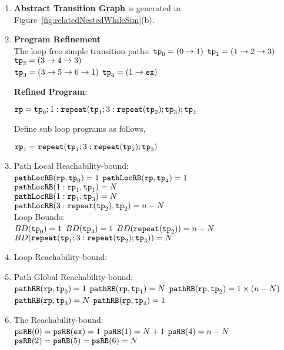 \begin{enumerate}
  \item  \textbf{Abstract Transition Graph} is generated in Figure~\ref{fig:relatedNestedWhileSim}(b).

  \item \textbf{Program Refinement}
  \\
  The loop free simple transition paths:
          $\mathtt{tp}_0 = (0 \to 1)$
          \quad
          $\mathtt{tp}_1 = (1 \to 2 \to 3)$
          \quad           
          $\mathtt{tp}_2 = (3 \to 4 \to 3)$
          \\
          $\mathtt{tp}_3 = (3 \to 5 \to 6 \to 1)$
          \quad
          $\mathtt{tp}_4 = (1 \to \mathtt{ex})$

  \textbf{Refined Program}:

  $\mathtt{rp} = \mathtt{tp}_0 ; 1: \mathtt{repeat}(\mathtt{tp}_1; 3: \mathtt{repeat}(\mathtt{tp}_2); \mathtt{tp}_3); \mathtt{tp}_4$
  
  Define sub loop programs as follows,

  $\mathtt{rp}_1 = \mathtt{repeat}(\mathtt{tp}_1; 3: \mathtt{repeat}(\mathtt{tp}_2); \mathtt{tp}_3)$
\item {Path Local Reachability-bound}:
\\
$\mathtt{pathLocRB}(\mathtt{rp}, \mathtt{tp}_0) = 1$ \quad
$\mathtt{pathLocRB}(\mathtt{rp}, \mathtt{tp}_4) = 1$ \\
$\mathtt{pathLocRB}(1: \mathtt{rp}_1, \mathtt{tp}_1) = N$ \\
$\mathtt{pathLocRB}(1: \mathtt{rp}_1, \mathtt{tp}_3) = N$ \\
$\mathtt{pathLocRB}(3: \mathtt{repeat}(\mathtt{tp}_2), \mathtt{tp}_2) = n - N$ 
\\
Loop Bounds:
\\
$BD(\mathtt{tp}_0) = 1$
\quad
$BD(\mathtt{tp}_4) = 1$
\quad
$BD(\mathtt{repeat}(\mathtt{tp}_2)) = n - N $
\\
$BD(\mathtt{repeat}(\mathtt{tp}_1; 3: \mathtt{repeat}(\mathtt{tp}_2); \mathtt{tp}_3)) = N $
%
\item Loop Reachability-bound:
\\
%
%
\item Path Global Reachability-bound:
\\
$\mathtt{pathRB}(\mathtt{rp}, \mathtt{tp}_0) = 1$ \quad
$\mathtt{pathRB}(\mathtt{rp}, \mathtt{tp}_1) = N$ \quad
$\mathtt{pathRB}(\mathtt{rp}, \mathtt{tp}_2) = 1 \times (n - N)$ \\
$\mathtt{pathRB}(\mathtt{rp}, \mathtt{tp}_3) = N$ \quad
$\mathtt{pathRB}(\mathtt{rp}, \mathtt{tp}_4) = 1$
%
\item The Reachability-bound:
\\
$\mathtt{psRB}(0) = \mathtt{psRB}(\mathtt{ex}) = 1$ \quad
$\mathtt{psRB}(1) = N + 1$ \quad
$\mathtt{psRB}(4) = n - N$ \quad \\
$\mathtt{psRB}(2) = \mathtt{psRB}(5) =  \mathtt{psRB}(6) = N$ \quad
{}
\end{enumerate}